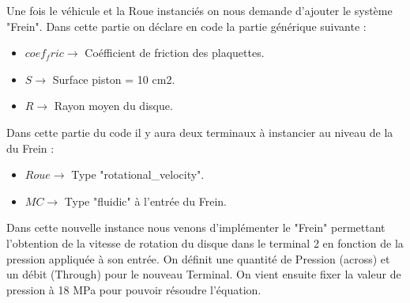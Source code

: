 \newpage 

Une fois le véhicule et la Roue instanciés on nous demande d'ajouter le système "Frein". Dans cette partie on déclare en code la partie générique suivante :\\
\begin{itemize}
    \item $coef_fric    \rightarrow$ Coéfficient de friction des plaquettes.
    \item $S    \rightarrow$ Surface piston = 10 cm2.
    \item $R   \rightarrow$ Rayon moyen du disque.
\end{itemize}

Dans cette partie du code il y aura deux terminaux à instancier au niveau de la du Frein :

\begin{itemize}
    \item $Roue    \rightarrow$ Type "rotational\_velocity".
    \item $MC    \rightarrow$ Type "fluidic" à l'entrée du Frein.
\end{itemize}

Dans cette nouvelle instance nous venons d'implémenter le "Frein" permettant l'obtention de la vitesse de rotation du disque dans le terminal 2 en fonction de la pression appliquée à son entrée. On définit une quantité de Pression (across) et un débit (Through) pour le nouveau Terminal. On vient ensuite fixer la valeur de pression à 18 MPa pour pouvoir résoudre l'équation.


